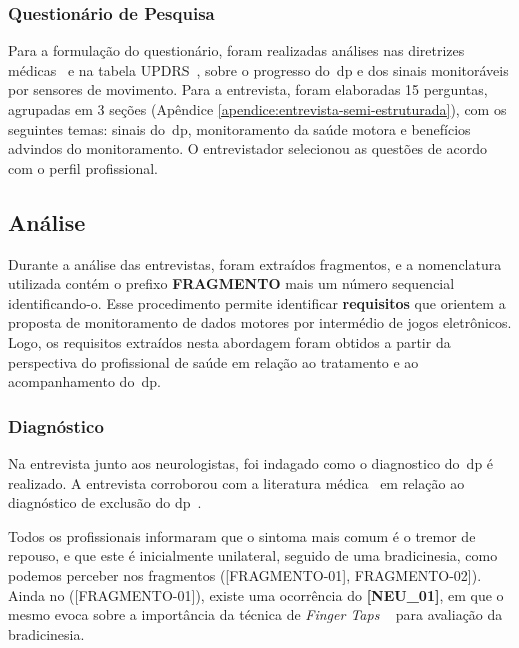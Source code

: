 \subsubsection{Questionário de Pesquisa}
Para a formulação do questionário, foram realizadas análises nas diretrizes médicas~\cite{protpar010,national2006parkinson} e na tabela UPDRS~\cite{updrs87}, sobre o progresso do~\ac{dp} e dos sinais monitoráveis por sensores de movimento. Para a entrevista, foram elaboradas 15 perguntas, agrupadas em 3 seções (Apêndice \ref{apendice:entrevista-semi-estruturada}), com os seguintes temas: sinais do~\ac{dp}, monitoramento da saúde motora e benefícios advindos do monitoramento. O entrevistador selecionou as questões de acordo com o perfil profissional.

\subsection{Análise}
Durante a análise das entrevistas, foram extraídos fragmentos, e a nomenclatura utilizada contém o prefixo \textbf{FRAGMENTO} mais um número sequencial identificando-o. Esse procedimento permite identificar \textbf{requisitos} que orientem a proposta de monitoramento de dados motores por intermédio de jogos eletrônicos. Logo, os requisitos extraídos nesta abordagem foram obtidos a partir da perspectiva do profissional de saúde em relação ao tratamento e ao acompanhamento do~\ac{dp}. 

\subsubsection{Diagnóstico}\label{section:analise_diagnostico}

Na entrevista junto aos neurologistas, foi indagado como o diagnostico do~\ac{dp} é realizado.  A entrevista corroborou com a literatura médica~\cite{tolosa06,vedolin2003} em relação ao diagnóstico de exclusão do \ac{dp}~\cite{protpar010,national2006parkinson}.  

Todos os profissionais informaram que o sintoma mais comum é o tremor de repouso, e que este é inicialmente unilateral, seguido de uma bradicinesia, como podemos perceber nos fragmentos ([FRAGMENTO-01], FRAGMENTO-02]). Ainda no ([FRAGMENTO-01]), existe uma ocorrência do \textbf{[NEU\_01]}, em que o mesmo evoca sobre a importância da técnica de \textit{Finger Taps} ~\cite{updrs87} para avaliação da bradicinesia.




